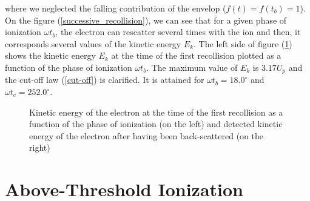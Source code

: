 \documentclass[a4paper]{article}
\begin{document}
where we neglected the falling contribution of the envelop ($f(t)=f(t_{b})=1$). \\
On the figure (\ref{successive_recollision}), we can see that for a given phase of ionization $\omega t_{b}$, the electron can rescatter several times with the ion and then, it corresponds several values of the kinetic energy $E_{k}$. 
The left side of figure (\ref{kinetic_energy}) shows the kinetic energy $E_{k}$ at the time of the first recollision plotted as a function of the phase of ionization $\omega t_{b}$. The maximum value of $E_{k}$ is $3.17U_{p}$ and the cut-off law (\ref{cut-off}) is clarified. It is attained for $\omega t_{b}=18.0^{\circ}$ and $\omega t_{c}=252.0^{\circ}$. \\
\begin{figure}
\centering
 
 \caption{Kinetic energy of the electron at the time of the first recollision as a function of the phase of ionization (on the left) and detected kinetic energy of the electron after having been back-scattered (on the right)}
 \label{kinetic_energy} 
\end{figure}


\section{Above-Threshold Ionization}
\end{document}
